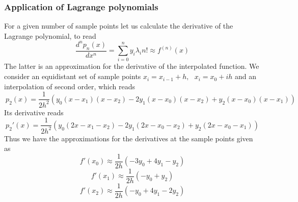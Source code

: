 \subsubsection{Application of Lagrange polynomials}
For a given number of sample points let us calculate the derivative of the
Lagrange polynomial, to read
\[ 
\frac{d^n p_n(x)}{dx^n}=\sum_{i=0}^ny_i\lambda_in!\approx f^{(n)}(x)
\]
The latter is an approximation for the derivative of the interpolated function.
We consider an equidistant set of sample points $x_i=x_{i-1}+h,\ \ \ x_i=x_0+i
h$ and an interpolation of second order, which reads
\[
~p_2(x)=\frac{1}{2h^2}
\left( y_0(x-x_1)(x-x_2)
     -2y_1(x-x_0)(x-x_2)
      +y_2(x-x_0)(x-x_1)\right)
\]
Its derivative reads
\[
p_2'(x)=\frac{1}{2h^2}
\left( y_0(2x-x_1-x_2)
     -2y_1(2x-x_0-x_2)
      +y_2(2x-x_0-x_1) \right)
\]
Thus we have the approximations for the derivatives at the sample points given
as
\begin{equation}\label{eq:leftderiv} 
f'(x_0)\approx\frac{1}{2h}\left({-3y_0+4y_1-y_2}\right)
\end{equation}
\begin{equation}\label{eq:centerderiv}
f'(x_1)\approx\frac{1}{2h}\left({-y_0+y_2}\right)
\end{equation}
\begin{equation}\label{eq:rightderiv}
f'(x_2)\approx\frac{1}{2h}\left({-y_0+4y_1-2y_2}\right)
\end{equation}
